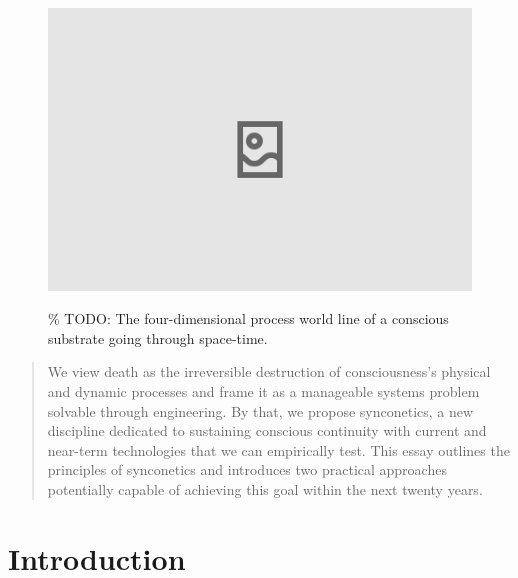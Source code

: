 \documentclass[10pt]{article}
\begin{document}
\begin{sloppypar}

  \begin{figure}[ht]
    \centering
    \includegraphics[width=\textwidth]{figures/cover.png}
    \label{fig:cover}
    \caption{\% TODO: The four-dimensional process world line of a conscious substrate going through space-time.}
  \end{figure}
  \newpage



  \begin{abstract}
    We view death as the irreversible destruction of consciousness’s physical and dynamic processes and frame it as a manageable systems problem solvable through engineering. By that, we propose synconetics, a new discipline dedicated to sustaining conscious continuity with current and near-term technologies that we can empirically test. This essay outlines the principles of synconetics and introduces two practical approaches potentially capable of achieving this goal within the next twenty years.
  \end{abstract}

  \pagebreak
  \tableofcontents
  \pagebreak
  \listoffigures
  \pagebreak


  \section{Introduction}
  \label{sec:introduction}


\end{sloppypar}
\end{document}
